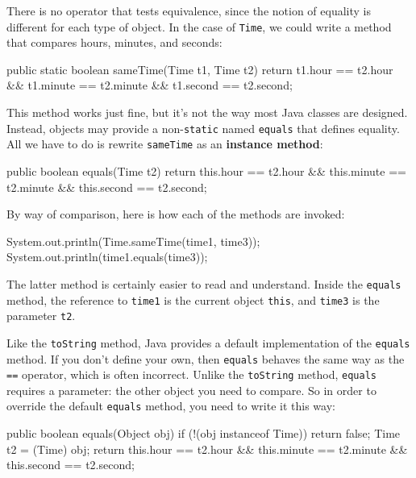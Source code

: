 \documentclass[12pt]{book}
\theoremstyle{exercise}
\newcommand{\java}[1]{\lstinline{#1}} %
\begin{document}
There is no operator that tests equivalence, since the notion of equality is different for each type of object.
In the case of \java{Time}, we could write a method that compares hours, minutes, and seconds:

\begin{code}
    public static boolean sameTime(Time t1, Time t2) {
        return t1.hour == t2.hour
            && t1.minute == t2.minute
            && t1.second == t2.second;
    }
\end{code}


This method works just fine, but it's not the way most Java classes are designed.
Instead, objects may provide a non-\java{static} named \java{equals} that defines equality.
All we have to do is rewrite \java{sameTime} as an {\bf instance method}:

\begin{code}
    public boolean equals(Time t2) {
        return this.hour == t2.hour
            && this.minute == t2.minute
            && this.second == t2.second;
    }
\end{code}

By way of comparison, here is how each of the methods are invoked:

\begin{code}
    System.out.println(Time.sameTime(time1, time3));
    System.out.println(time1.equals(time3));
\end{code}

The latter method is certainly easier to read and understand.
Inside the \java{equals} method, the reference to \java{time1} is the current object \java{this}, and \java{time3} is the parameter \java{t2}.

Like the \java{toString} method, Java provides a default implementation of the \java{equals} method.
If you don't define your own, then \java{equals} behaves the same way as the \java{==} operator, which is often incorrect.
Unlike the \java{toString} method, \java{equals} requires a parameter: the other object you need to compare.
So in order to override the default \java{equals} method, you need to write it this way:

\begin{code}
    public boolean equals(Object obj) {
        if (!(obj instanceof Time)) {
            return false;
        }
        Time t2 = (Time) obj;
        return this.hour == t2.hour
            && this.minute == t2.minute
            && this.second == t2.second;
    }
\end{code}
\end{document}

